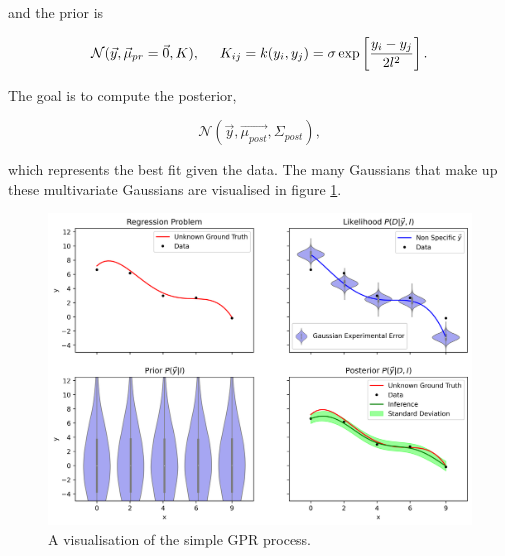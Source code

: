 \noindent and the prior is

\begin{equation}
  \mathcal{N}(\vec{y}, \vec \mu_{pr} = \vec{0}, K),\hspace{0.5cm} K_{ij} = k(y_i, y_j) = \sigma \exp\left[{\frac{y_i - y_j}{2l^2}}\right].
  \label{eq:prior}
\end{equation}

\noindent The goal is to compute the posterior,

\begin{equation}
  \mathcal{N}(\vec{y}, \vec{\mu_{post}}, \Sigma_{post}),
  \label{eq:posterior}
\end{equation}

\noindent which represents the best fit given the data. The many Gaussians that make up these multivariate Gaussians are visualised in figure \ref{fig:gprvis}. 

\begin{figure}[H]
  \centering
  \includegraphics[width=13cm]{images/gprvis.png}
  \caption{A visualisation of the simple GPR process.}
  \label{fig:gprvis}
\end{figure}


